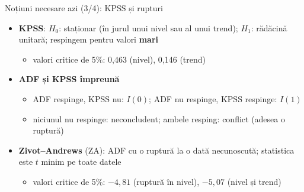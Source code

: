 \begin{frame}{Noțiuni necesare azi (3/4): KPSS și rupturi}
\itemsize{\small}
\begin{itemize}
    \item \textbf{KPSS}: $H_0$: staționar (în jurul unui nivel sau al unui trend); $H_1$: rădăcină unitară; respingem pentru valori \textbf{mari}
    \begin{itemize}
        \item valori critice de 5\%: 0,463 (nivel), 0,146 (trend)
    \end{itemize}
    \item \textbf{ADF și KPSS împreună}
    \begin{itemize}
        \item ADF respinge, KPSS nu: $I(0)$; ADF nu respinge, KPSS respinge: $I(1)$
        \item niciunul nu respinge: neconcludent; ambele resping: conflict (adesea o ruptură)
    \end{itemize}
    \item \textbf{Zivot--Andrews} (ZA): ADF cu o ruptură la o dată necunoscută; statistica este $t$ minim pe toate datele
    \begin{itemize}
        \item valori critice de 5\%: $-4{,}81$ (ruptură în nivel), $-5{,}07$ (nivel și trend)
    \end{itemize}
\end{itemize}
\end{frame}

